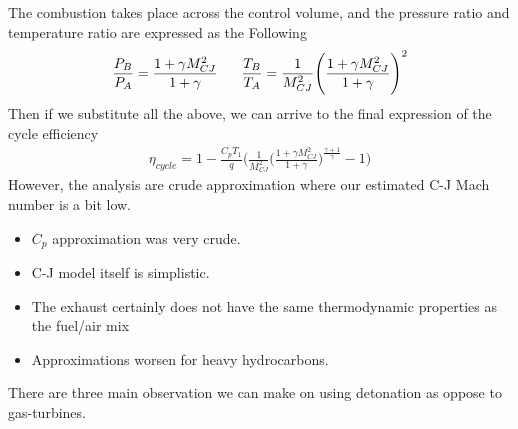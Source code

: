 \documentclass[a4paper,10pt]{article}
\begin{document}
The combustion takes place across the control volume, and the pressure ratio and temperature ratio are expressed as the Following
\begin{gather*}
    \frac{P_B}{P_A}=\frac{1+\gamma M_{CJ}^2}{1+\gamma}\hspace*{0.6cm}\frac{T_B}{T_A}=\frac{1}{M_{CJ}^2}\Bigg(\frac{1+\gamma M_{CJ}^2}{1+\gamma}\Bigg)^2
\end{gather*}
Then if we substitute all the above, we can arrive to the final expression of the cycle efficiency
\begin{gather*}
    \boxed{\eta_{cycle} = 1-\frac{C_pT_1}{q}\Bigg(\frac{1}{M_{CJ}^2}\Bigg(\frac{1+\gamma M_{CJ}^2}{1+\gamma}\Bigg)^{\frac{\gamma+1}{\gamma}}-1\Bigg)}
\end{gather*}
However, the analysis are crude approximation where our estimated C-J Mach number is a bit low.
\begin{itemize}
    \item $C_p$ approximation was very crude. 
    \item C-J model itself is simplistic.
    \item The exhaust certainly does not have the same thermodynamic properties as the fuel/air mix
    \item Approximations worsen for heavy hydrocarbons. 
\end{itemize}
There are three main observation we can make on using detonation as oppose to gas-turbines. 
\end{document}

